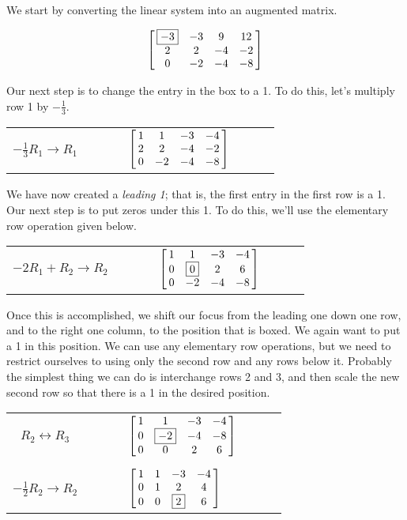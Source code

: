 {We start by converting the linear system into an augmented matrix.

$$\bmx{cccc}\fbox{$-3$}&-3&9&12\\ 2&2&-4&-2\\0&-2&-4&-8\emx$$

Our next step is to change the entry in the box to a 1. To do this, let's multiply row 1 by $-\frac13$.

\begin{center}\begin{tabular}{ccc}
\parbox{70pt}{\centering\small $-\frac13R_1\rightarrow R_1$}
&$\quad \quad$&
$\bmx{cccc}1&1&-3&-4\\ 2&2&-4&-2\\0&-2&-4&-8\emx$
\end{tabular}\end{center}

We have now created a \textit{leading 1}; that is, the first entry in the first row is a 1. Our next step is to put zeros under this 1. To do this, we'll use the elementary row operation given below.

\begin{center}\begin{tabular}{ccc}
\parbox{70pt}{\centering\small $-2R_1+R_2\rightarrow R_2$}
&$\quad \quad$&
$\bmx{cccc}1&1&-3&-4\\ 0&\fbox{0}&2&6\\0&-2&-4&-8\emx$
\end{tabular}\end{center}

Once this is accomplished, we shift our focus from the leading one down one row, and to the right one column, to the position that is boxed. We again want to put a 1 in this position. We can use any elementary row operations, but we need to restrict ourselves to using only the second row and any rows below it. Probably the simplest thing we can do is interchange rows 2 and 3, and then scale the new second row so that there is a 1 in the desired position.

\begin{center}\begin{tabular}{ccl}
\parbox{70pt}{\centering\small $R_2\leftrightarrow R_3$}
&$\quad \quad$&
$\bmx{cccc}1&1&-3&-4\\0&\fbox{$-2$}&-4&-8 \\0&0&2&6\emx$\\
\\
\parbox{70pt}{\centering\small $-\frac12R_2\rightarrow R_2$}
&$\quad \quad$&
$\bmx{cccc}1&1&-3&-4\\0&1&2&4 \\0&0&\fbox{2}&6\emx$
\end{tabular}\end{center}

}
